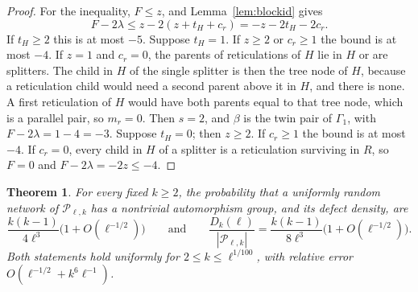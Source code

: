 \documentclass[11pt,a4paper]{article}
\newtheorem{theorem}{Theorem}[section]
\theoremstyle{definition}
\newcommand{\cP}{\mathcal{P}}
\begin{document}
\begin{proof}
For the inequality, $F\le z$, and Lemma~\ref{lem:blockid} gives
\[
F-2\lambda\le z-2(z+t_H+c_r)=-z-2t_H-2c_r .
\]
If $t_H\ge2$ this is at most $-5$. Suppose $t_H=1$. If $z\ge2$ or $c_r\ge1$ the bound is at most $-4$. If $z=1$ and $c_r=0$, the parents of reticulations of $H$ lie in $H$ or are splitters. The child in $H$ of the single splitter is then the tree node of $H$, because a reticulation child would need a second parent above it in $H$, and there is none. A first reticulation of $H$ would have both parents equal to that tree node, which is a parallel pair, so $m_r=0$. Then $s=2$, and $\beta$ is the twin pair of $\Gamma_1$, with $F-2\lambda=1-4=-3$. Suppose $t_H=0$; then $z\ge2$. If $c_r\ge1$ the bound is at most $-4$. If $c_r=0$, every child in $H$ of a splitter is a reticulation surviving in $R$, so $F=0$ and $F-2\lambda=-2z\le-4$.
\end{proof}

\begin{theorem}\label{thm:symlaw}
For every fixed $k\ge2$, the probability that a uniformly random network of $\cP_{\ell,k}$ has a nontrivial automorphism group, and its defect density, are
\begin{equation}\label{eq:symlaw}
\frac{k(k-1)}{4\ell^3}\bigl(1+O(\ell^{-1/2})\bigr)\qquad\text{and}\qquad\frac{D_k(\ell)}{|\cP_{\ell,k}|}=\frac{k(k-1)}{8\ell^3}\bigl(1+O(\ell^{-1/2})\bigr).
\end{equation}
Both statements hold uniformly for $2\le k\le\ell^{1/100}$, with relative error $O(\ell^{-1/2}+k^6\ell^{-1})$.
\end{theorem}
\end{document}
